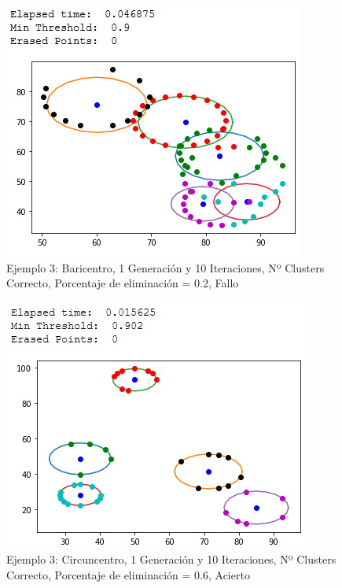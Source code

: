 \documentclass[conference,a4paper]{IEEEtran}
\begin{document}
\begin{figure}[H]
\centering
\includegraphics[scale=0.65]{Experimentacion/Ejemplo2/ej2_b_1_10_le_wrong}
\caption{Ejemplo 3: Baricentro, 1 Generación y 10 Iteraciones,  Nº Clusters Correcto, Porcentaje de eliminación = 0.2, Fallo\\}
\end{figure}

\begin{figure}[H]
\centering
\includegraphics[scale=0.65]{Experimentacion/Ejemplo3/ej3_c_1_10_me_correct}
\caption{Ejemplo 3: Circuncentro, 1 Generación y 10 Iteraciones,  Nº Clusters Correcto, Porcentaje de eliminación = 0.6, Acierto\\}
\end{figure}
\end{document}
